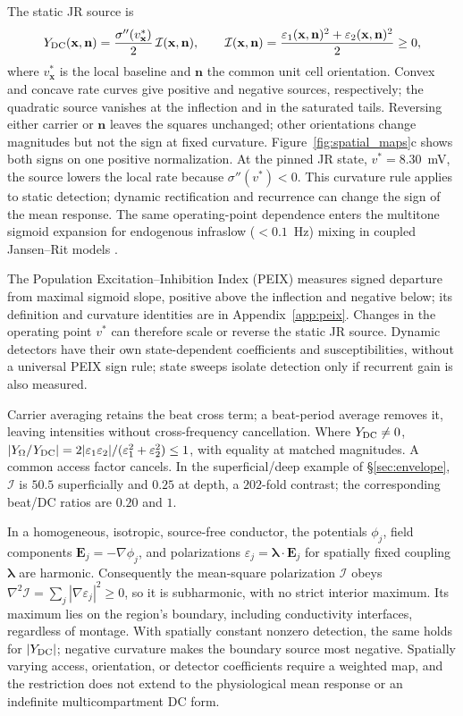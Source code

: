 \documentclass[a4paper]{article}
\newcommand{\Sig}{\sigma}
\begin{document}
The static JR source is
\[
Y_{\rm DC}(\mathbf x,\mathbf n)
=\frac{\Sig''(v^*_{\mathbf x})}{2}\,\mathcal I(\mathbf x,\mathbf n),
\qquad
\mathcal I(\mathbf x,\mathbf n)
=\frac{\varepsilon_1(\mathbf x,\mathbf n)^2+
\varepsilon_2(\mathbf x,\mathbf n)^2}{2}\ge0,
\]
where $v^*_{\mathbf x}$ is the local baseline and $\mathbf n$ the common
unit cell orientation. Convex and concave rate curves give positive and
negative sources, respectively; the quadratic source vanishes at the inflection
and in the saturated tails.
Reversing either carrier or $\mathbf n$ leaves the squares unchanged;
other orientations change magnitudes but not the sign at fixed curvature.
Figure~\ref{fig:spatial_maps}c shows both signs on one positive normalization.
At the pinned JR state, $v^*=8.30$~mV, the source lowers the local rate
because $\Sig''(v^*)<0$.
This curvature rule applies to static detection; dynamic rectification and
recurrence can change the sign of the mean response.
The same operating-point dependence enters the multitone sigmoid expansion for
endogenous infraslow ($<0.1$~Hz) mixing in coupled Jansen--Rit models \cite{Just2026mixing}.

\label{sec:opp}
The Population Excitation--Inhibition Index (PEIX) \cite{ruffini2025cfc}
measures signed departure from maximal sigmoid slope, positive above the
inflection and negative below; its definition and curvature identities are
in Appendix~\ref{app:peix}. Changes in the operating point $v^*$ can
therefore scale or reverse the static JR source.
Dynamic detectors have their own state-dependent coefficients and susceptibilities, without
a universal PEIX sign rule; state sweeps isolate detection only if recurrent
gain is also measured.

Carrier averaging retains the beat cross term; a beat-period average removes
it, leaving intensities without cross-frequency cancellation. Where
$Y_{\rm DC}\ne0$,
$|Y_\Omega/Y_{\rm DC}|=2|\varepsilon_1\varepsilon_2|/
(\varepsilon_1^2+\varepsilon_2^2)\le1$, with equality at matched magnitudes.
A common access factor cancels. In the superficial/deep example of \S\ref{sec:envelope}, $\mathcal I$ is
$50.5$ superficially and $0.25$ at depth, a $202$-fold contrast;
the corresponding beat/DC ratios are $0.20$ and $1$.

In a homogeneous, isotropic, source-free conductor, the potentials $\phi_j$,
field components $\mathbf E_j=-\nabla\phi_j$, and polarizations
$\varepsilon_j=\boldsymbol\lambda\cdot\mathbf E_j$ for spatially fixed
coupling $\boldsymbol\lambda$ are harmonic. Consequently the mean-square polarization
$\mathcal I$ obeys $\nabla^2\mathcal I=\sum_j|\nabla\varepsilon_j|^2\ge0$, so it is subharmonic, with no strict interior maximum. Its maximum
lies on the region's boundary, including conductivity interfaces, regardless
of montage. With spatially constant nonzero detection, the same holds for
$|Y_{\rm DC}|$; negative curvature makes the boundary source most negative.
Spatially varying access, orientation, or detector coefficients require a
weighted map, and the restriction does not extend to the physiological mean
response or an indefinite multicompartment DC form.
\end{document}
